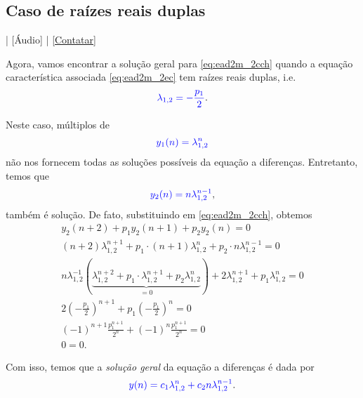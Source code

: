 \subsection{Caso de raízes reais duplas}

\begin{flushright}
  [Vídeo] | [Áudio] | \href{https://phkonzen.github.io/notas/contato.html}{[Contatar]}
\end{flushright}

Agora, vamos encontrar a solução geral para \eqref{eq:ead2m_2cch} quando a equação característica associada \eqref{eq:ead2m_2ec} tem raízes reais duplas, i.e.
\begin{equation}
  {\color{blue}\lambda_{1,2} = -\frac{p_1}{2}}.
\end{equation}

Neste caso, múltiplos de
\begin{equation}
  {\color{blue}y_1(n) = \lambda^n_{1,2}}
\end{equation}
não nos fornecem todas as soluções possíveis da equação a diferenças. Entretanto, temos que
\begin{equation}
  {\color{blue}y_2(n) = n\lambda_{1,2}^{n-1}},
\end{equation}
também é solução. De fato, substituindo em \eqref{eq:ead2m_2cch}, obtemos
\begin{gather}
  y_2(n+2) + p_1y_2(n+1) + p_2y_2(n) = 0\\
  (n+2)\lambda_{1,2}^{n+1} + p_1\cdot(n+1)\lambda_{1,2}^n + p_2\cdot n\lambda_{1,2}^{n-1} = 0\\
  n\lambda_{1,2}^{-1}\left(\underbrace{\lambda_{1,2}^{n+2}+p_1\cdot\lambda_{1,2}^{n+1}+p_2\lambda_{1,2}^n}_{=0}\right) + 2\lambda_{1,2}^{n+1}+p_1\lambda_{1,2}^n = 0\\
  2\left(-\frac{p_1}{2}\right)^{n+1}+p_1\left(-\frac{p_1}{2}\right)^n = 0\\
  (-1)^{n+1}\frac{p_1^{n+1}}{2^n} + (-1)^n\frac{p_1^{n+1}}{2^n} = 0\\
  0 = 0.
\end{gather}

Com isso, temos que a \emph{solução geral} da equação a diferenças é dada por
\begin{equation}
  {\color{blue}y(n) = c_1\lambda_{1,2}^n + c_2n\lambda_{1,2}^{n-1}}.
\end{equation}

